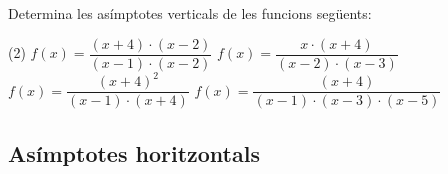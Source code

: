 \begin{mylist}
\exer  \label{exercici:anterior} Determina les asímptotes verticals de les funcions següents:
 
\begin{tasks}(2) 
\task $f(x)=\dfrac{(x+4)\cdot (x-2)}{(x-1)\cdot (x-2)} $  \task  $f(x)=\dfrac{x\cdot (x+4)}{(x-2)\cdot (x-3)} $  
\task  $f(x)=\dfrac{(x+4)^{2} }{(x-1)\cdot (x+4)} $  \task  $f(x)=\dfrac{(x+4)}{(x-1)\cdot (x-3)\cdot (x-5)}$
\end{tasks}

\answers{[$x=1$, $x=2$; $x=3$, $x=1$, $x=1$; $x=3$; $x=5$]}

\end{mylist}


\subsection{Asímptotes horitzontals}

